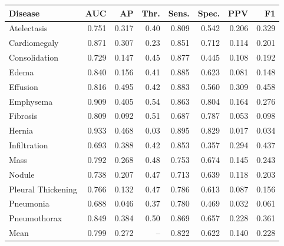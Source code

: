\begin{tabular}{lrrrrrrr}
\toprule
Disease & AUC & AP & Thr. & Sens. & Spec. & PPV & F1 \\
\midrule
Atelectasis & 0.751 & 0.317 & 0.40 & 0.809 & 0.542 & 0.206 & 0.329 \\
Cardiomegaly & 0.871 & 0.307 & 0.23 & 0.851 & 0.712 & 0.114 & 0.201 \\
Consolidation & 0.729 & 0.147 & 0.45 & 0.877 & 0.445 & 0.108 & 0.192 \\
Edema & 0.840 & 0.156 & 0.41 & 0.885 & 0.623 & 0.081 & 0.148 \\
Effusion & 0.816 & 0.495 & 0.42 & 0.883 & 0.560 & 0.309 & 0.458 \\
Emphysema & 0.909 & 0.405 & 0.54 & 0.863 & 0.804 & 0.164 & 0.276 \\
Fibrosis & 0.809 & 0.092 & 0.51 & 0.687 & 0.787 & 0.053 & 0.098 \\
Hernia & 0.933 & 0.468 & 0.03 & 0.895 & 0.829 & 0.017 & 0.034 \\
Infiltration & 0.693 & 0.388 & 0.42 & 0.853 & 0.357 & 0.294 & 0.437 \\
Mass & 0.792 & 0.268 & 0.48 & 0.753 & 0.674 & 0.145 & 0.243 \\
Nodule & 0.738 & 0.207 & 0.47 & 0.713 & 0.639 & 0.118 & 0.203 \\
Pleural Thickening & 0.766 & 0.132 & 0.47 & 0.786 & 0.613 & 0.087 & 0.156 \\
Pneumonia & 0.688 & 0.046 & 0.37 & 0.780 & 0.469 & 0.032 & 0.061 \\
Pneumothorax & 0.849 & 0.384 & 0.50 & 0.869 & 0.657 & 0.228 & 0.361 \\
\midrule
Mean & 0.799 & 0.272 & -- & 0.822 & 0.622 & 0.140 & 0.228 \\
\bottomrule
\end{tabular}

